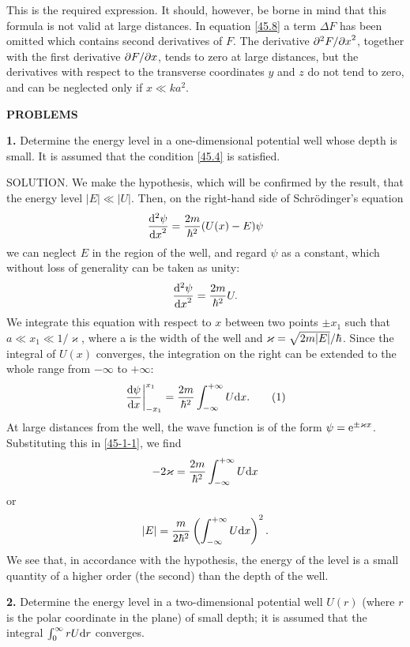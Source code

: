 This is the required expression. It should, however, be borne in mind that this formula is not valid at large distances. In equation \eqref{45.8} a term $ \Delta F $ has been omitted which contains second derivatives of $ F $. The derivative $ \partial^2F/{\partial x}^2 $, together with the first derivative $ \partial F/\partial x $, tends to zero at large distances, but the derivatives with respect to the transverse coordinates $ y $ and $ z $ do not tend to zero, and can be neglected only if $ x\ll ka^2 $.





{\small
\textbf{PROBLEMS}


\textbf{1.} Determine the energy level in a one-dimensional potential well whose depth is small. It is assumed that the condition \eqref{45.4} is satisfied.





SOLUTION. We make the hypothesis, which will be confirmed by the result, that the energy level $ |E|\ll |U| $. Then, on the right-hand side of Schr\"odinger’s equation
\[ \frac{\mathrm{d}^2\psi}{{\mathrm{d} x}^2}=\frac{2m}{\hbar^2}(U(x)-E)\psi \]
we can neglect $ E $ in the region of the well, and regard $\psi$ as a constant, which without loss of generality can be taken as unity:
\[ \frac{\mathrm{d}^2\psi}{{\mathrm{d} x}^2}=\frac{2m}{\hbar^2}U. \]
We integrate this equation with respect to $ x $ between two points $ \pm x_1 $ such that $ a\ll x_1\ll 1/\varkappa $, where a is the width of the well and $ \varkappa = \sqrt{2m|E|}/\hbar $. Since the integral of $ U (x) $ converges, the integration on the right can be extended to the whole range from $ -\infty $ to $ +\infty $:
\begin{equation}\label{45-1-1}
\left.\frac{\mathrm{d} \psi}{\mathrm{d} x}\right|_{-x_1}^{x_1}=\frac{2m}{\hbar^2}\int_{-\infty}^{+\infty}U\mathrm{d} x.\tag{1}
\end{equation}
At large distances from the well, the wave function is of the form $ \psi = \mathrm{e}^{\pm\varkappa x} $. Substituting this in \eqref{45-1-1}, we find
\[ -2\varkappa=\frac{2m}{\hbar^2}\int_{-\infty}^{+\infty}U\mathrm{d} x \]
or
\[ |E|=\frac{m}{2\hbar^2}\left(\int_{-\infty}^{+\infty}U\mathrm{d} x \right)^2. \]
We see that, in accordance with the hypothesis, the energy of the level is a small quantity of a higher order (the second) than the depth of the well.





\textbf{2.} Determine the energy level in a two-dimensional potential well $ U (r) $ (where $ r $ is the polar coordinate in the plane) of small depth; it is assumed that the integral $ \int_{0}^{\infty}rU\mathrm{d} r $ converges.





}

